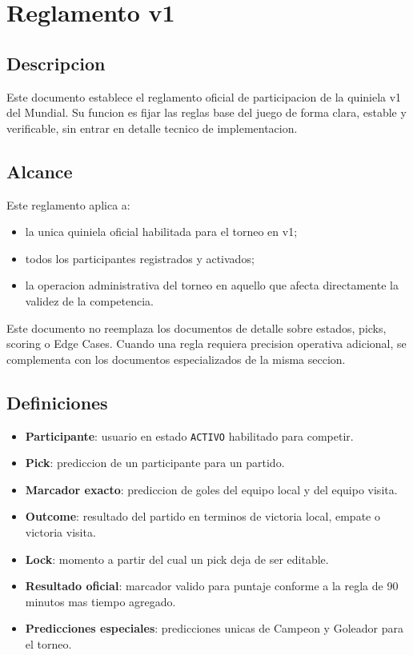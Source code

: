 \section{Reglamento v1}

\subsection{Descripcion}

Este documento establece el reglamento oficial de participacion de la quiniela v1 del Mundial. Su funcion es fijar las reglas base del juego de forma clara, estable y verificable, sin entrar en detalle tecnico de implementacion.

\subsection{Alcance}

Este reglamento aplica a:

\begin{itemize}
  \item la unica quiniela oficial habilitada para el torneo en v1;
  \item todos los participantes registrados y activados;
  \item la operacion administrativa del torneo en aquello que afecta directamente la validez de la competencia.
\end{itemize}

Este documento no reemplaza los documentos de detalle sobre estados, picks, scoring o Edge Cases. Cuando una regla requiera precision operativa adicional, se complementa con los documentos especializados de la misma seccion.

\subsection{Definiciones}

\begin{itemize}
  \item \textbf{Participante}: usuario en estado \texttt{ACTIVO} habilitado para competir.
  \item \textbf{Pick}: prediccion de un participante para un partido.
  \item \textbf{Marcador exacto}: prediccion de goles del equipo local y del equipo visita.
  \item \textbf{Outcome}: resultado del partido en terminos de victoria local, empate o victoria visita.
  \item \textbf{Lock}: momento a partir del cual un pick deja de ser editable.
  \item \textbf{Resultado oficial}: marcador valido para puntaje conforme a la regla de 90 minutos mas tiempo agregado.
  \item \textbf{Predicciones especiales}: predicciones unicas de Campeon y Goleador para el torneo.
\end{itemize}

